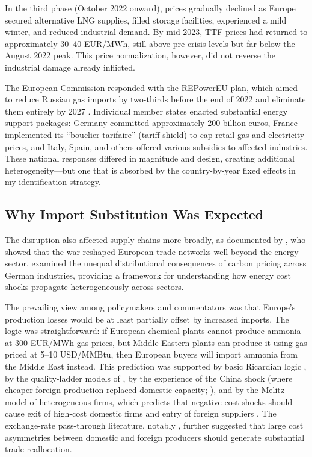 \documentclass[12pt]{article}
\begin{document}
In the third phase (October 2022 onward), prices gradually declined as Europe secured alternative LNG supplies, filled storage facilities, experienced a mild winter, and reduced industrial demand. By mid-2023, TTF prices had returned to approximately 30--40 EUR/MWh, still above pre-crisis levels but far below the August 2022 peak. This price normalization, however, did not reverse the industrial damage already inflicted.

The European Commission responded with the REPowerEU plan, which aimed to reduce Russian gas imports by two-thirds before the end of 2022 and eliminate them entirely by 2027 \citep{eurocommission2023}. Individual member states enacted substantial energy support packages: Germany committed approximately 200 billion euros, France implemented its ``bouclier tarifaire'' (tariff shield) to cap retail gas and electricity prices, and Italy, Spain, and others offered various subsidies to affected industries. These national responses differed in magnitude and design, creating additional heterogeneity---but one that is absorbed by the country-by-year fixed effects in my identification strategy.

\subsection{Why Import Substitution Was Expected}

The disruption also affected supply chains more broadly, as documented by \citet{marin2023}, who showed that the war reshaped European trade networks well beyond the energy sector. \citet{moll2023} examined the unequal distributional consequences of carbon pricing across German industries, providing a framework for understanding how energy cost shocks propagate heterogeneously across sectors.

The prevailing view among policymakers and commentators was that Europe's production losses would be at least partially offset by increased imports. The logic was straightforward: if European chemical plants cannot produce ammonia at 300 EUR/MWh gas prices, but Middle Eastern plants can produce it using gas priced at 5--10 USD/MMBtu, then European buyers will import ammonia from the Middle East instead. This prediction was supported by basic Ricardian logic \citep{costinot2012}, by the quality-ladder models of \citet{grossman1991}, by the experience of the China shock (where cheaper foreign production replaced domestic capacity; \citealt{autor2013china}), and by the Melitz model of heterogeneous firms, which predicts that negative cost shocks should cause exit of high-cost domestic firms and entry of foreign suppliers \citep{melitz2003, helpman2004}. The exchange-rate pass-through literature, notably \citet{berman2012}, further suggested that large cost asymmetries between domestic and foreign producers should generate substantial trade reallocation.
\end{document}

